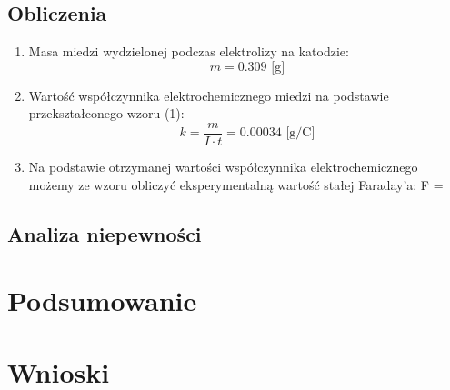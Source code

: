 \documentclass[a4paper,12pts]{article}
\begin{document}
	
	\subsection{Obliczenia}
	
	\begin{enumerate}
		\item Masa miedzi wydzielonej podczas elektrolizy na katodzie:
		$$m = 0.309 \textrm{ [g]}$$
		\item Wartość współczynnika elektrochemicznego miedzi na podstawie przekształconego wzoru (1): 
		$$k = \frac{m}{I \cdot t} = 0.00034 \textrm{ [g/C]}$$
		\item Na podstawie otrzymanej wartości współczynnika elektrochemicznego możemy ze wzoru  obliczyć eksperymentalną wartość stałej Faraday'a:
		$$F = 	
	\end{enumerate}
		
	
	\subsection{Analiza niepewności}
	

	\section{Podsumowanie}

	
	\section{Wnioski}
\end{document}
